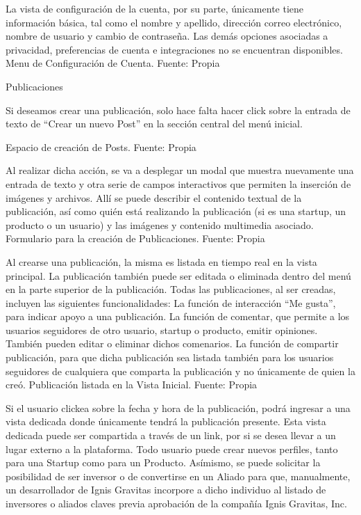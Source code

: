 La vista de configuración de la cuenta, por su parte, únicamente tiene información básica, tal como el nombre y apellido, dirección correo electrónico, nombre de usuario y cambio de contraseña. Las demás opciones asociadas a privacidad, preferencias de cuenta e integraciones no se encuentran disponibles.
Menu de Configuración de Cuenta. Fuente: Propia

Publicaciones

Si deseamos crear una publicación, solo hace falta hacer click sobre la entrada de texto de “Crear un nuevo Post” en la sección central del menú inicial.

Espacio de creación de Posts. Fuente: Propia

Al realizar dicha acción, se va a desplegar un modal que muestra nuevamente una entrada de texto y otra serie de campos interactivos que permiten la inserción de imágenes y archivos. Allí se puede describir el contenido textual de la publicación, así como quién está realizando la publicación (si es una startup, un producto o un usuario) y las imágenes y contenido multimedia asociado.
Formulario para la creación de Publicaciones. Fuente: Propia

Al crearse una publicación, la misma es listada en tiempo real en la vista principal. La publicación también puede ser editada o eliminada dentro del menú en la parte superior de la publicación. Todas las publicaciones, al ser creadas, incluyen las siguientes funcionalidades:
La función de interacción “Me gusta”, para indicar apoyo a una publicación.
La función de comentar, que permite a los usuarios seguidores de otro usuario, startup o producto, emitir opiniones. También pueden editar o eliminar dichos comenarios.
La función de compartir publicación, para que dicha publicación sea listada también para los usuarios seguidores de cualquiera que comparta la publicación y no únicamente de quien la creó.
Publicación listada en la Vista Inicial. Fuente: Propia

Si el usuario clickea sobre la fecha y hora de la publicación, podrá ingresar a una vista dedicada donde únicamente tendrá la publicación presente. Esta vista dedicada puede ser compartida a través de un link, por si se desea llevar a un lugar externo a la plataforma. Todo usuario puede crear nuevos perfiles, tanto para una Startup como para un Producto.  Asímismo, se puede solicitar la posibilidad de ser inversor o de convertirse en un Aliado para que, manualmente, un desarrollador de Ignis Gravitas incorpore a dicho individuo al listado de inversores o aliados claves previa aprobación de la compañía Ignis Gravitas, Inc.

